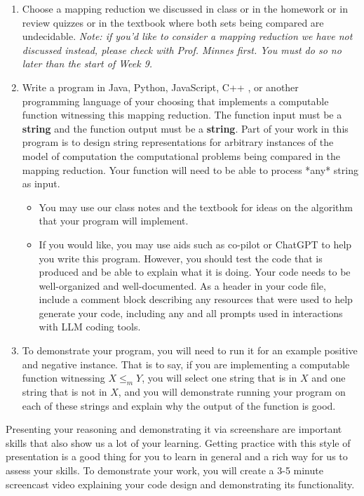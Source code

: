 \documentclass[12pt, oneside]{article}
\begin{document}
\begin{enumerate}
\item Choose a mapping reduction we discussed in class or in the homework
or in review quizzes or in the textbook where both sets being compared are 
undecidable. {\it Note:
if you'd like to consider a  mapping reduction we have not discussed instead, 
please check with Prof. Minnes first. 
You must do so no later than the start of Week 9.}
\item Write a program in Java, Python, JavaScript, C++ , or another programming language of your choosing that implements a computable function witnessing this mapping reduction.  The function input must be a {\bf string}  and the function 
output must be a {\bf string}. Part of your work in this program 
is to design string representations for arbitrary instances of the model of 
computation the computational problems being compared in the mapping reduction.
Your function will need to be able to process *any* string as input.
\begin{itemize}
   \item You may use our class notes and the textbook for ideas on the algorithm that your program will implement.
   \item If you would like, you may use aids such as co-pilot or ChatGPT to help you write this program. 
   However, you should test the code that is produced and be able to explain what it is doing. Your code needs to be well-organized and well-documented.
   As a header in your code file, include a comment block describing any resources that were used to 
   help generate your code, including any and all prompts used in interactions 
   with LLM coding tools.
\end{itemize}

\item To demonstrate your program, you will need to run it for an example positive and negative instance. That is to say, if you are implementing 
a computable function witnessing $X \leq_m Y$, you will select one string that is in $X$ and one string that is not in $X$, and you will 
 demonstrate running your program on each of these strings and explain why 
 the output of the function is good.
\end{enumerate}

Presenting your reasoning and demonstrating it via screenshare are important 
skills that also  show us a lot of your learning. Getting practice with this 
style of presentation is a good thing  for you to learn in general and a rich 
way for us to assess your skills. 
To demonstrate your work, you will create a 3-5 minute screencast video 
explaining your code design and demonstrating its functionality.
\end{document}
